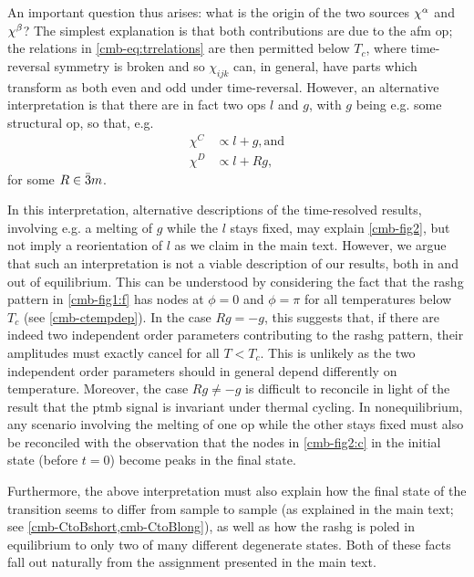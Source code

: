 An important question thus arises: what is the origin of the two sources $\chi^\alpha$ and $\chi^\beta$?
The simplest explanation is that both contributions are due to the \gls{afm} \gls{op}; the relations in \cref{cmb-eq:trrelations} are then permitted below $T_c$, where time-reversal symmetry is broken and so $\chi_{ijk}$ can, in general, have parts which transform as both even and odd under time-reversal.
However, an alternative interpretation is that there are in fact two \glspl{op} $l$ and $g$, with $g$ being e.g. some structural \gls{op}, so that, e.g.
\begin{equation}
\label{cmb-eq:proptolg}
\begin{aligned}
\chi^C &\propto l + g, \text{and} \\
\chi^D &\propto l + Rg,
\end{aligned}
\end{equation}
for some $R \in \bar{3}m$.

In this interpretation, alternative descriptions of the time-resolved results, involving e.g. a melting of $g$ while the $l$ stays fixed, may explain \cref{cmb-fig2}, but not imply a reorientation of $l$ as we claim in the main text.
However, we argue that such an interpretation is not a viable description of our results, both in and out of equilibrium.
This can be understood by considering the fact that the \gls{rashg} pattern in \cref{cmb-fig1:f} has nodes at $\phi=0$ and $\phi=\pi$ for all temperatures below $T_c$ (see \cref{cmb-ctempdep}).
In the case $Rg = -g$, this suggests that, if there are indeed two independent order parameters contributing to the \gls{rashg} pattern, their amplitudes must exactly cancel for all $T < T_c$.
This is unlikely as the two independent order parameters should in general depend differently on temperature.
Moreover, the case $Rg \neq -g$ is difficult to reconcile in light of the result that the \gls{ptmb} signal is invariant under thermal cycling.
In nonequilibrium, any scenario involving the melting of one \gls{op} while the other stays fixed must also be reconciled with the observation that the nodes in \cref{cmb-fig2:c} in the initial state (before $t=0$) become peaks in the final state.

Furthermore, the above interpretation must also explain how the final state of the transition seems to differ from sample to sample (as explained in the main text; see \cref{cmb-CtoBshort,cmb-CtoBlong}), as well as how the \gls{rashg} is poled in equilibrium to only two of many different degenerate states.
Both of these facts fall out naturally from the assignment presented in the main text.

